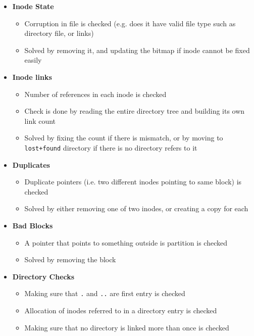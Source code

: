 \documentclass[12pt]{article}
\begin{document}
\begin{enumerate}[1.]
\begin{enumerate}[a)]
\begin{itemize}
\begin{itemize}
                \begin{itemize}
                    \item \textbf{Inode State}
                    \begin{itemize}
                        \item Corruption in file is checked (e.g. does it have valid file type such as directory file, or links)
                        \item Solved by removing it, and updating the bitmap if inode cannot be fixed easily
                    \end{itemize}
                    \item \textbf{Inode links}
                    \begin{itemize}
                        \item Number of references in each inode is checked
                        \item Check is done by reading the entire directory tree and building its own link count
                        \item Solved by fixing the count if there is mismatch, or by moving to \texttt{lost+found}
                        directory if there is no directory refers to it
                    \end{itemize}
                    \item \textbf{Duplicates}
                    \begin{itemize}
                        \item Duplicate pointers (i.e. two different inodes pointing to same block) is checked
                        \item Solved by either removing one of two inodes, or creating a copy for each
                    \end{itemize}
                    \item \textbf{Bad Blocks}

                    \begin{itemize}
                        \item A pointer that points to something outside is partition is checked
                        \item Solved by removing the block
                    \end{itemize}

                    \item \textbf{Directory Checks}

                    \begin{itemize}
                        \item Making sure that \texttt{.} and \texttt{..} are first entry is checked
                        \item Allocation of inodes referred to in a directory entry is checked
                        \item Making sure that no directory is linked more than once is checked
                    \end{itemize}
                \end{itemize}


\end{itemize}
\end{itemize}
\end{enumerate}
\end{enumerate}
\end{document}
